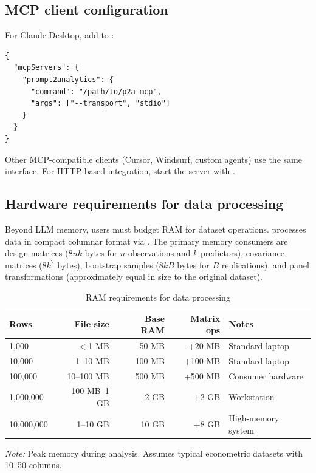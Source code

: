 \subsection{MCP client configuration}

For Claude Desktop, add to :

\begin{verbatim}
{
  "mcpServers": {
    "prompt2analytics": {
      "command": "/path/to/p2a-mcp",
      "args": ["--transport", "stdio"]
    }
  }
}
\end{verbatim}

\noindent Other MCP-compatible clients (Cursor, Windsurf, custom agents)
use the same  interface. For HTTP-based
integration, start the server with .

\subsection{Hardware requirements for data processing}
\label{app:hardware-requirements}

Beyond LLM memory, users must budget RAM for dataset operations.
 processes data in compact columnar format via
. The primary memory consumers are design matrices
($8nk$ bytes for $n$ observations and $k$ predictors), covariance
matrices ($8k^2$ bytes), bootstrap samples ($8kB$ bytes for $B$
replications), and panel transformations (approximately equal in size
to the original dataset).

\begin{table}[htbp]
\centering
\begin{threeparttable}
\caption{RAM requirements for data processing}
\label{tab:hardware-data}
\small
\begin{tabular}{lrrrl}
\toprule
Rows & File size & Base RAM & Matrix ops & Notes \\
\midrule
1,000 & $<$1 MB & 50 MB & +20 MB & Standard laptop \\
10,000 & 1--10 MB & 100 MB & +100 MB & Standard laptop \\
100,000 & 10--100 MB & 500 MB & +500 MB & Consumer hardware \\
1,000,000 & 100 MB--1 GB & 2 GB & +2 GB & Workstation \\
10,000,000 & 1--10 GB & 10 GB & +8 GB & High-memory system \\
\bottomrule
\end{tabular}
\begin{tablenotes}[flushleft]
\item \emph{Note:} Peak memory during analysis. Assumes typical
econometric datasets with 10--50 columns.
\end{tablenotes}
\end{threeparttable}
\end{table}

